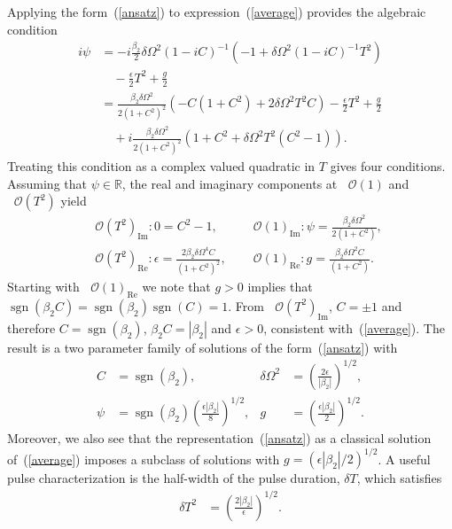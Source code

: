 \documentclass[%
 aps,
 jmp,%
 amsmath,amssymb,
 reprint,%
nofootinbib
]{revtex4-1}
\providecommand{\bigO}[1]{\ensuremath{\mathop{}\mathopen{}\mathcal{O}\mathopen{}\left(#1\right)}}
\DeclareMathOperator{\sgn}{sgn}
\begin{document}
Applying the form~(\ref{ansatz}) to expression~(\ref{average}) provides the algebraic condition
\begin{align*}
	i\psi &= -i\frac{\beta_2}{2}\delta\Omega^2(1-iC)^{-1}
	\left(-1 + \delta\Omega^2(1-iC)^{-1}T^2\right) \\
	& \quad -\frac{\epsilon}{2}T^2 + \frac{g}{2} \\
	&= \frac{\beta_2\delta\Omega^2}{2(1+C^2)^2}(-C(1+C^2)+2\delta\Omega^2 T^2C) -\frac{\epsilon}{2}T^2 + \frac{g}{2}\\
	& \quad + i\frac{\beta_2\delta\Omega^2}{2(1+C^2)^2}(1+C^2 + \delta\Omega^2 T^2(C^2-1)).
\end{align*}
Treating this condition as a complex valued quadratic in $T$ gives four conditions. Assuming that $\psi\in\mathbb{R}$, the real and imaginary components at $\bigO{1}$ and $\bigO{T^2}$ yield
\begin{align*}
	&\bigO{T^2}_{\textrm{Im}}: 0 = C^2 - 1, &
	&\bigO{1}_{\textrm{Im}}: \psi = \frac{\beta_2\delta\Omega^2}{2(1+C^2)}, \\
	&\bigO{T^2}_{\textrm{Re}}: \epsilon = \frac{2\beta_2\delta\Omega^4C}{(1+C^2)^2}, &
	&\bigO{1}_{\textrm{Re}}: g = \frac{\beta_2\delta\Omega^2C}{(1+C^2)}.
\end{align*}
Starting with $\bigO{1}_{\textrm{Re}}$ we note that $g > 0$ implies that $\sgn(\beta_2 C) = \sgn(\beta_2)\sgn(C) = 1$. From $\bigO{T^2}_{\textrm{Im}}$, $C = \pm 1$ and therefore $C = \sgn(\beta_2)$, $\beta_2 C = |\beta_2|$ and $\epsilon > 0$, consistent with~(\ref{average}). The result is a two parameter family of solutions of the form~(\ref{ansatz}) with
\begin{align*}
	C &= \sgn(\beta_2),&
	\delta\Omega^2 &= \left(\frac{2\epsilon}{|\beta_2|}\right)^{1/2}, \\
	\psi &= \sgn(\beta_2)\left(\frac{\epsilon|\beta_2|}{8}\right)^{1/2},&
	g &= \left(\frac{\epsilon|\beta_2|}{2}\right)^{1/2}.
\end{align*}
Moreover, we also see that the representation~(\ref{ansatz}) as a classical solution of~(\ref{average}) imposes a subclass of solutions with $g = \left(\epsilon|\beta_2|/2\right)^{1/2}$. A useful pulse characterization is the half-width of the pulse duration, $\delta T$, which satisfies
\begin{align*}
	\delta T^2 &= \left(\frac{2|\beta_2|}{\epsilon}\right)^{1/2}.
\end{align*}
\end{document}

